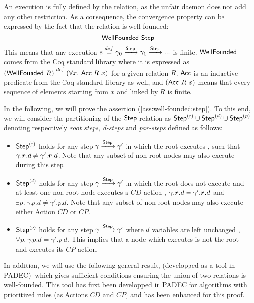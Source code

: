 An execution is fully defined by the \Step relation, as the unfair
daemon does not add any other restriction. As a consequence, the
convergence property can be expressed by the fact that the \Step
relation is well-founded:
%
\begin{equation}\label{ass:well-founded:step}
  \mathsf{WellFounded}~ \mathsf{Step}
\end{equation}
%
This means that any execution $e \stackrel{def}= \gamma_0 \xrightarrow{\mathsf{Step}} \gamma_1
\xrightarrow{\mathsf{Step}} ...$ is finite.  $\mathsf{WellFounded}$ comes from the Coq
standard library where it is expressed as $(\mathsf{WellFounded}~ R) \stackrel{def}=
(\forall x. ~\mathsf{Acc}~ R~ x)$ for a given relation $R$. $\mathsf{Acc}$ is an
inductive predicate from the Coq standard library as well, and $(\mathsf{Acc}~
R~ x)$ means that every sequence of elements starting from $x$ and
linked by $R$ is finite.

In the following, we will prove the assertion
(\ref{ass:well-founded:step}).  To this end, we will consider the
partitioning of the $\mathsf{Step}$ relation as \( \mathsf{Step}^{(r)} \cup \mathsf{Step}^{(d)} \cup
\mathsf{Step}^{(p)} \) denoting respectively \emph{root steps}, \emph{d-steps}
and \emph{par-steps} defined as follows:
\begin{itemize}
\item $\mathsf{Step}^{(r)}$ holds for any step $\gamma \xrightarrow{\mathsf{Step}} \gamma'$ in which the
  root executes \ie, such that $\gamma.\boldsymbol{r}.d \neq \gamma'.\boldsymbol{r}.d$. Note
  that any subset of non-root nodes may also execute during this step.
\item $\mathsf{Step}^{(d)}$ holds for any step $\gamma \xrightarrow{\mathsf{Step}} \gamma'$ in which the
  root does not execute and at least one non-root node executes a
  $CD$-action \ie, $\gamma.\boldsymbol{r}.d = \gamma'.\boldsymbol{r}.d$ and $\exists
  p.~ \gamma.p.d \neq \gamma'.p.d$.  Note that any subset of non-root
  nodes may also execute either Action $CD$ or $CP$.
\item $\mathsf{Step}^{(p)}$ holds for any step $\gamma \xrightarrow{\mathsf{Step}} \gamma'$ where $d$
  variables are left unchanged \ie, $\forall p.~ \gamma.p.d
  = \gamma'.p.d$. This implies that a node which executes is not the
  root and executes its $CP$-action.
\end{itemize}
In addition, we will use the following general result, (developped as
a tool in PADEC), which gives sufficient conditions ensuring the union
of two relations is well-founded. This tool has first been developped
in PADEC for algorithms with prioritized rules (as Actions $CD$ and
$CP$) and has been enhanced for this proof.
